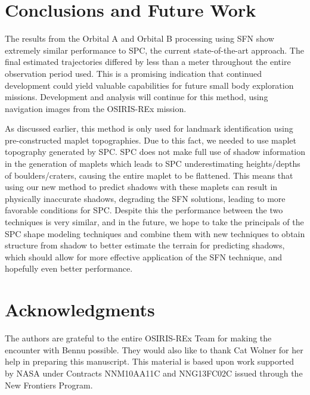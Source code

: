 \documentclass{src/RPI-SIW}
\begin{document}
\section*{Conclusions and Future Work}
The results from the Orbital A and Orbital B processing using SFN show extremely similar performance to SPC, the current state-of-the-art approach.  The final estimated trajectories differed by less than a meter throughout the entire observation period used.  This is a promising indication that continued development could yield valuable capabilities for future small body exploration missions.  Development and analysis will continue for this method, using navigation images from the OSIRIS-REx mission.

As discussed earlier, this method is only used for landmark identification using pre-constructed maplet topographies.  Due to this fact, we needed to use maplet topography generated by SPC.  SPC does not make full use of shadow information in the generation of maplets which leads to SPC underestimating heights/depths of boulders/craters, causing the entire maplet to be flattened.  This means that using our new method to predict shadows with these maplets can result in physically inaccurate shadows, degrading the SFN solutions, leading to more favorable conditions for SPC.  Despite this the performance between the two techniques is very similar, and in the future, we hope to take the principals of the SPC shape modeling techniques and combine them with new techniques to obtain structure from shadow to better estimate the terrain for predicting shadows, which should allow for more effective application of the SFN technique, and hopefully even better performance. 

\section*{Acknowledgments}
The authors are grateful to the entire OSIRIS-REx Team for making the encounter with Bennu possible.
They would also like to thank Cat Wolner for her help in preparing this manuscript.
This material is based upon work supported by NASA under Contracts NNM10AA11C and NNG13FC02C issued through the New Frontiers Program. 

\vspace{3pt}

\titleformat{\section}[runin]{\normalsize\bfseries}{\thesection}{0em}{\addperiod}
{\footnotesize }

\end{document}

